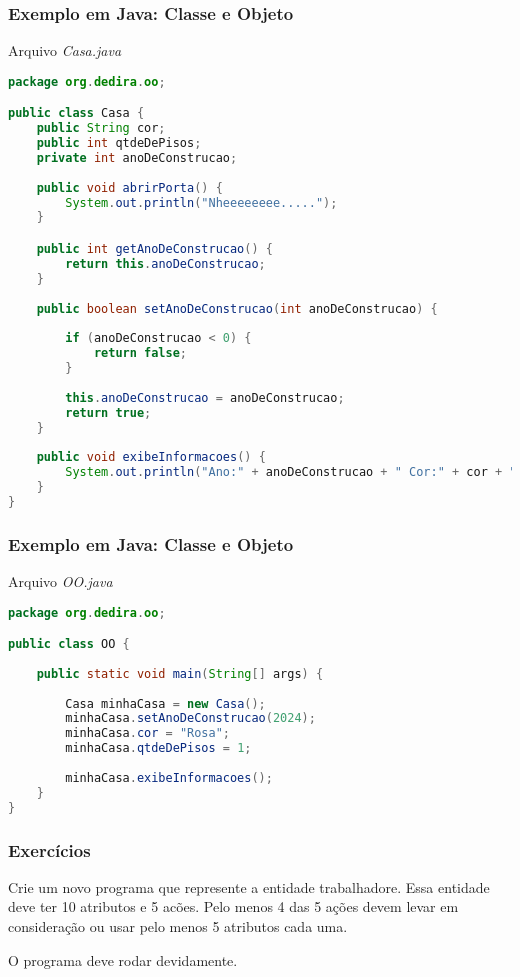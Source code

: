 \begin{frame}[fragile]
	\frametitle{Exemplo em Java: Classe e Objeto}
	\par Arquivo \textit{Casa.java}
	\begin{lstlisting}[language=Java]
package org.dedira.oo;

public class Casa {
	public String cor;
	public int qtdeDePisos;
	private int anoDeConstrucao;
	
	public void abrirPorta() {
		System.out.println("Nheeeeeeee.....");
	}

	public int getAnoDeConstrucao() {
		return this.anoDeConstrucao;
	}
	
	public boolean setAnoDeConstrucao(int anoDeConstrucao) {
		
		if (anoDeConstrucao < 0) {
			return false;
		}
		
		this.anoDeConstrucao = anoDeConstrucao;
		return true;
	}
	
	public void exibeInformacoes() {
		System.out.println("Ano:" + anoDeConstrucao + " Cor:" + cor + " Pisos:" + qtdeDePisos);
	}
}
	\end{lstlisting}
\end{frame}

\begin{frame}[fragile]
	\frametitle{Exemplo em Java: Classe e Objeto}
	\par Arquivo \textit{OO.java}
	\begin{lstlisting}[language=Java]
package org.dedira.oo;

public class OO {
	
	public static void main(String[] args) {
		
		Casa minhaCasa = new Casa();
		minhaCasa.setAnoDeConstrucao(2024);
		minhaCasa.cor = "Rosa";
		minhaCasa.qtdeDePisos = 1;
		
		minhaCasa.exibeInformacoes();
	}
}
	\end{lstlisting}
\end{frame}

\begin{frame}
	\frametitle{Exercícios}
	\par Crie um novo programa que represente a entidade trabalhadore. Essa entidade deve ter 10 atributos e 5 acões. Pelo menos 4 das 5 ações devem levar em consideração ou usar pelo menos 5 atributos cada uma.
	
	\par O programa deve rodar devidamente.
\end{frame}